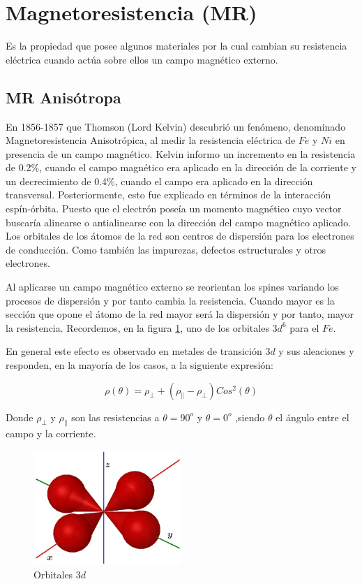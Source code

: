 \section{Magnetoresistencia (MR)}

Es la propiedad que posee algunos materiales por la cual cambian su resistencia eléctrica cuando actúa sobre ellos un campo magnético externo.


\subsection{MR Anisótropa}

En 1856-1857 que Thomson (Lord Kelvin) descubrió un fenómeno, denominado Magnetoresistencia Anisotrópica, al medir la resistencia eléctrica de $Fe$ y $Ni$ en presencia de un campo magnético. Kelvin informo un incremento en la resistencia de 0.2\%, cuando el campo magnético era aplicado en la dirección de la corriente y un decrecimiento de 0.4\%, cuando el campo era aplicado en la dirección transversal. Posteriormente, esto fue explicado en términos de la interacción espín-órbita. Puesto que el electrón poseía un momento magnético cuyo vector buscaría alinearse o antialinearse con la dirección del campo magnético aplicado. Los orbitales de los átomos de la red son centros de dispersión para los electrones de conducción. Como también las impurezas, defectos estructurales y otros electrones.


Al aplicarse un campo magnético externo se reorientan los spines variando los procesos de dispersión y por tanto cambia la resistencia. Cuando mayor es la sección que opone el átomo de la red mayor será la dispersión y por tanto, mayor la resistencia. Recordemos, en la figura \ref{fig:317}, uno de los orbitales $3d^{6}$ para el $Fe$.

En general este efecto es observado en metales de transición $3d$ y sus aleaciones y responden, en la mayoría de los casos, a la siguiente expresión:

\begin{equation}
	\rho(\theta)=\rho_{\perp}+(\rho_{\parallel}-\rho_{\perp})Cos^{2}(\theta)
\end{equation}

Donde $\rho_{\perp}$ y $\rho_{\parallel}$ son las resistencias a $\theta=90^{o}$ y $\theta=0^{o}$ ,siendo $\theta$ el ángulo entre el campo y la corriente.


\begin{figure}[H]
    \centering
    \includegraphics[width=0.5\textwidth]{./Figures/fig317}
	\caption{Orbitales $3d$}
	\label{fig:317}
\end{figure}

